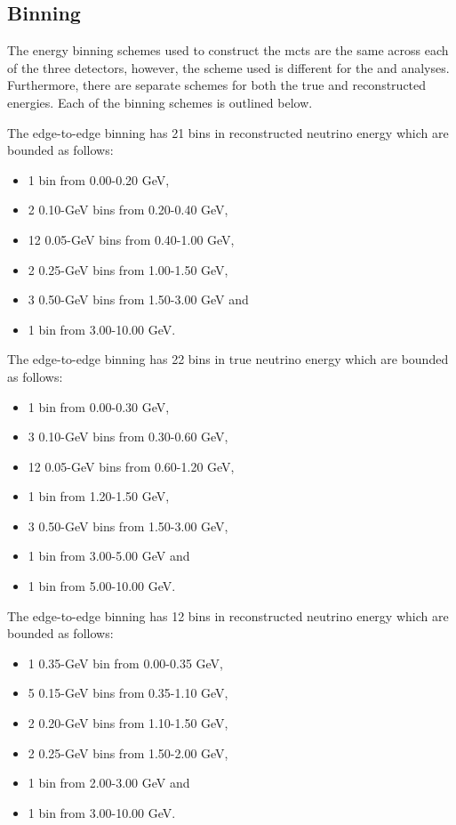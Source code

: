 \clearpage
\subsection{Binning}\label{sec:binning}
The energy binning schemes used to construct the \glspl{mct} are the same across each of the three detectors, however, the scheme used is different for the \numu and \nue analyses. Furthermore, there are separate schemes for both the true and reconstructed energies. Each of the binning schemes is outlined below. 

The \numu edge-to-edge binning has 21 bins in reconstructed neutrino energy which are bounded as follows:
\begin{itemize}
    \item 1 bin from 0.00-0.20 GeV,
    \item 2 0.10-GeV bins from 0.20-0.40 GeV,
    \item 12 0.05-GeV bins from 0.40-1.00 GeV,
    \item 2 0.25-GeV bins from 1.00-1.50 GeV,
    \item 3 0.50-GeV bins from 1.50-3.00 GeV and
    \item 1 bin from 3.00-10.00 GeV.
\end{itemize}

The \numu edge-to-edge binning has 22 bins in true neutrino energy which are bounded as follows:
\begin{itemize}
    \item 1 bin from 0.00-0.30 GeV,
    \item 3 0.10-GeV bins from 0.30-0.60 GeV,
    \item 12 0.05-GeV bins from 0.60-1.20 GeV,
    \item 1 bin from 1.20-1.50 GeV,
    \item 3 0.50-GeV bins from 1.50-3.00 GeV,
    \item 1 bin from 3.00-5.00 GeV and
    \item 1 bin from 5.00-10.00 GeV.
\end{itemize}

The \nue edge-to-edge binning has 12 bins in reconstructed neutrino energy which are bounded as follows:
\begin{itemize}
    \item 1 0.35-GeV bin from 0.00-0.35 GeV,
    \item 5 0.15-GeV bins from 0.35-1.10 GeV,
    \item 2 0.20-GeV bins from 1.10-1.50 GeV,
    \item 2 0.25-GeV bins from 1.50-2.00 GeV,
    \item 1 bin from 2.00-3.00 GeV and
    \item 1 bin from 3.00-10.00 GeV.
\end{itemize}

